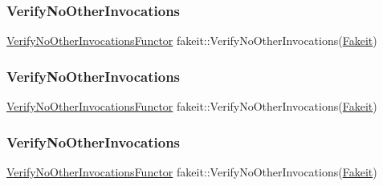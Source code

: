 \mbox{\label{namespacefakeit_a1fdaffe6f7ef1789d8ef832cc4cc19c3}} 
\subsubsection{\texorpdfstring{VerifyNoOtherInvocations}{VerifyNoOtherInvocations}\hspace{0.1cm}{\footnotesize\ttfamily [2/9]}}
{\footnotesize\ttfamily \mbox{\hyperlink{classfakeit_1_1VerifyNoOtherInvocationsFunctor}{Verify\+No\+Other\+Invocations\+Functor}} fakeit\+::\+Verify\+No\+Other\+Invocations(\mbox{\hyperlink{single__header_2tpunit_2fakeit_8hpp_a2b1f324059bec9d07841630bd5c2e7bc}{Fakeit}})\hspace{0.3cm}{\ttfamily [static]}}

\mbox{\label{namespacefakeit_a1fdaffe6f7ef1789d8ef832cc4cc19c3}} 
\subsubsection{\texorpdfstring{VerifyNoOtherInvocations}{VerifyNoOtherInvocations}\hspace{0.1cm}{\footnotesize\ttfamily [3/9]}}
{\footnotesize\ttfamily \mbox{\hyperlink{classfakeit_1_1VerifyNoOtherInvocationsFunctor}{Verify\+No\+Other\+Invocations\+Functor}} fakeit\+::\+Verify\+No\+Other\+Invocations(\mbox{\hyperlink{single__header_2tpunit_2fakeit_8hpp_a2b1f324059bec9d07841630bd5c2e7bc}{Fakeit}})\hspace{0.3cm}{\ttfamily [static]}}

\mbox{\label{namespacefakeit_a1fdaffe6f7ef1789d8ef832cc4cc19c3}} 
\subsubsection{\texorpdfstring{VerifyNoOtherInvocations}{VerifyNoOtherInvocations}\hspace{0.1cm}{\footnotesize\ttfamily [4/9]}}
{\footnotesize\ttfamily \mbox{\hyperlink{classfakeit_1_1VerifyNoOtherInvocationsFunctor}{Verify\+No\+Other\+Invocations\+Functor}} fakeit\+::\+Verify\+No\+Other\+Invocations(\mbox{\hyperlink{single__header_2tpunit_2fakeit_8hpp_a2b1f324059bec9d07841630bd5c2e7bc}{Fakeit}})\hspace{0.3cm}{\ttfamily [static]}}

